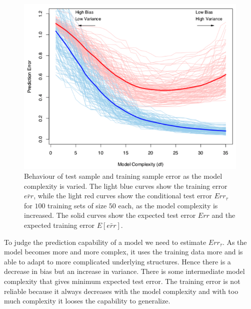 \documentclass[12pt, letterpaper]{article}
\theoremstyle{definition}
\begin{document}
\begin{figure}
\includegraphics[scale=0.6]{img/testErr}
\caption{Behaviour of test sample and training sample error as the model complexity is varied. The light blue curves show the training error $\bar{err}$, while the light red curves show the conditional test error $Err_\tau$ for $100$ training sets of size $50$ each, as the model complexity is increased. The solid curves show the expected test error $Err$ and the expected training error $E[\bar{err}]$.}
\label{testErr}
\end{figure}
To judge the prediction capability of a model we need to estimate $Err_\tau$. As the model becomes more and more complex, it uses the training data more and is able to adapt to more complicated underlying structures. Hence there is a decrease in bias but an increase in variance. There is some intermediate model complexity that gives minimum expected test error. The training error is not reliable because it always decreases with the model complexity and with too much complexity it looses the capability to generalize.
\end{document}
